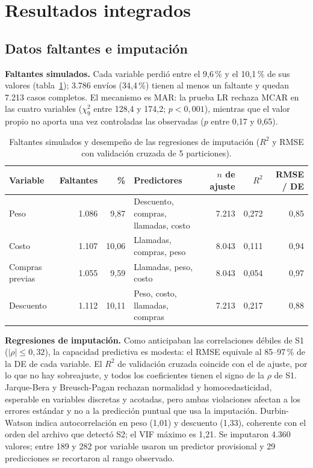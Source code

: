 \documentclass[11pt,a4paper]{article}
\begin{document}
\section{Resultados integrados}\label{sec:resultados}
\subsection{Datos faltantes e imputación}\label{sec:result-faltantes}
\textbf{Faltantes simulados.} Cada variable perdió entre el 9,6\,\% y el 10,1\,\% de sus valores (tabla~\ref{tab:imputacion}); 3.786 envíos (34,4\,\%) tienen al menos un faltante y quedan 7.213 casos completos. El mecanismo es MAR: la prueba LR rechaza MCAR en las cuatro variables ($\chi^2_9$ entre 128,4 y 174,2; $p < 0{,}001$), mientras que el valor propio no aporta una vez controladas las observadas ($p$ entre 0,17 y 0,65).

\begin{table}[!htb]\centering\footnotesize\setlength{\tabcolsep}{4pt}
\caption{Faltantes simulados y desempeño de las regresiones de imputación ($R^2$ y RMSE con validación cruzada de 5 particiones).}\label{tab:imputacion}
\begin{tabular}{@{}lrrlrrr@{}}\toprule
Variable & Faltantes & \% & Predictores & $n$ de ajuste & $R^2$ & RMSE / DE\\\midrule
Peso & 1.086 & 9,87 & Descuento, compras, llamadas, costo & 7.213 & 0,272 & 0,85\\
Costo & 1.107 & 10,06 & Llamadas, compras, peso & 8.043 & 0,111 & 0,94\\
Compras previas & 1.055 & 9,59 & Llamadas, peso, costo & 8.043 & 0,054 & 0,97\\
Descuento & 1.112 & 10,11 & Peso, costo, llamadas, compras & 7.213 & 0,217 & 0,88\\
\bottomrule\end{tabular}
\end{table}

\textbf{Regresiones de imputación.} Como anticipaban las correlaciones débiles de S1 ($|\rho| \le 0{,}32$), la capacidad predictiva es modesta: el RMSE equivale al 85--97\,\% de la DE de cada variable. El $R^2$ de validación cruzada coincide con el de ajuste, por lo que no hay sobreajuste, y todos los coeficientes tienen el signo de la $\rho$ de S1. Jarque-Bera y Breusch-Pagan rechazan normalidad y homocedasticidad, esperable en variables discretas y acotadas, pero ambas violaciones afectan a los errores estándar y no a la predicción puntual que usa la imputación. Durbin-Watson indica autocorrelación en peso (1,01) y descuento (1,33), coherente con el orden del archivo que detectó S2; el VIF máximo es 1,21. Se imputaron 4.360 valores; entre 189 y 282 por variable usaron un predictor provisional y 29 predicciones se recortaron al rango observado.
\end{document}

